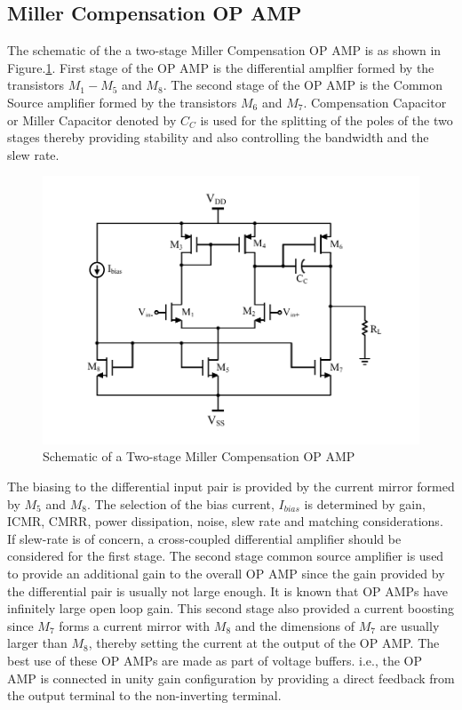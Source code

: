 \subsection{Miller Compensation OP AMP}
The schematic of the a two-stage Miller Compensation OP AMP is as shown in Figure.\ref{fig:OPAMP_Schematic_Ibias}. First stage of the OP AMP is the differential amplfier formed by the transistors $M_1-M_5$ and $M_8$. The second stage of the OP AMP is the Common Source amplifier formed by the transistors $M_6$ and $M_7$. Compensation Capacitor or Miller Capacitor denoted by $C_C$ is used for the splitting of the poles of the two stages thereby providing stability and also controlling the bandwidth and the slew rate. 
\begin{figure} [H]
\centering
\includegraphics[scale=1]{Figures/Schematics/OPAMP_Ibias.pdf}
\caption{Schematic of a Two-stage Miller Compensation OP AMP}
\label{fig:OPAMP_Schematic_Ibias}
\end{figure}
The biasing to the differential input pair is provided by the current mirror formed by $M_5$ and $M_8$. The selection of the bias current, $I_{bias}$ is determined by gain, ICMR, CMRR, power dissipation, noise, slew rate and matching considerations. If slew-rate is of concern, a cross-coupled differential amplifier should be considered for the first stage. The second stage common source amplifier is used to provide an additional gain to the overall OP AMP since the gain provided by the differential pair is usually not large enough. It is known that OP AMPs have infinitely large open loop gain. This second stage also provided a current boosting since $M_7$ forms a current mirror with $M_8$ and the dimensions of $M_7$ are usually larger than $M_8$, thereby setting the current at the output of the OP AMP. The best use of these OP AMPs are made as part of voltage buffers. i.e., the OP AMP is connected in unity gain configuration by providing a direct feedback from the output terminal to the non-inverting terminal.
\vfill
\clearpage
